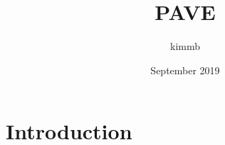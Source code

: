 \documentclass{article}
\title{PAVE}
\author{kimmb }
\date{September 2019}
\begin{document}
\maketitle

\section{Introduction}
\end{document}
